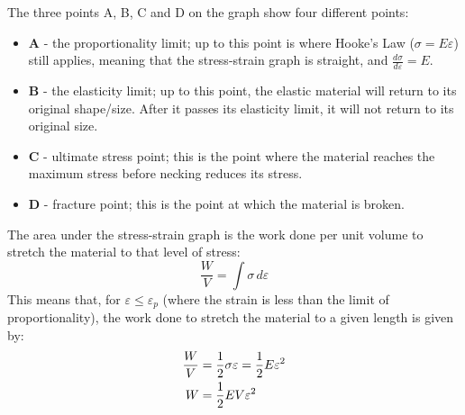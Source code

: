                 The three points A, B, C and D on the graph show four different points:
                \begin{itemize}
                    \item \textbf{A} - the proportionality limit; up to this point is where Hooke's Law ($\sigma=E\varepsilon$) still applies, meaning that the stress-strain graph is straight, and $\frac{d\sigma}{d\varepsilon}=E$.
                    \item \textbf{B} - the elasticity limit; up to this point, the elastic material will return to its original shape/size.
                    After it passes its elasticity limit, it will not return to its original size.
                    \item \textbf{C} - ultimate stress point; this is the point where the material reaches the maximum stress before necking reduces its stress.
                    \item \textbf{D} - fracture point; this is the point at which the material is broken.
                \end{itemize}

                The area under the stress-strain graph is the work done per unit volume to stretch the material to that level of stress:
                \begin{equation}
                    \frac{W}{V}=\int\sigma\,d\varepsilon
                \end{equation}
                This means that, for $\varepsilon\le\varepsilon_p$ (where the strain is less than the limit of proportionality), the work done to stretch the material to a given length is given by:
                \begin{align}
                    \frac{W}{V}&=\frac{1}{2}\sigma\varepsilon=\frac{1}{2} E\varepsilon^2 \\
                    W&=\frac{1}{2} EV\varepsilon^2
                \end{align}
            
